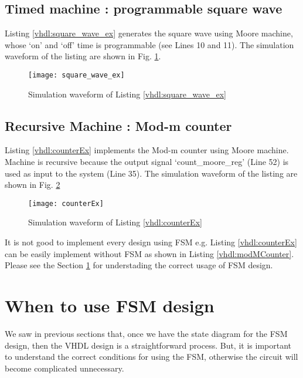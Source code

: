 

\subsection{Timed machine : programmable square wave }
Listing \ref{vhdl:square_wave_ex} generates the square wave using Moore machine, whose `on' and `off' time is programmable (see Lines 10 and 11).  The simulation waveform of the listing are shown in Fig. \ref{fig:square_wave_ex}.

\begin{figure}[!h]
	\centering
	\texttt{[image: square\_wave\_ex]}
	\caption{Simulation waveform of Listing \ref{vhdl:square_wave_ex}}
	\label{fig:square_wave_ex}
\end{figure}



\subsection{Recursive Machine : Mod-m counter}
Listing \ref{vhdl:counterEx} implements the Mod-m counter using Moore machine. Machine is recursive because the output signal `count\_moore\_reg' (Line 52) is used as input to the system (Line 35). The simulation waveform of the listing are shown in Fig. \ref{fig:counterEx}

\begin{figure}[!h]
	\centering
	\texttt{[image: counterEx]}
	\caption{Simulation waveform of Listing \ref{vhdl:counterEx}}
	\label{fig:counterEx}
\end{figure}

\begin{noNumBox}
It is not good to implement every design using FSM e.g. Listing \ref{vhdl:counterEx} can be easily implement without FSM as shown in Listing \ref{vhdl:modMCounter}. Please see the Section \ref{sec:whentouseFsm} for understading the correct usage of FSM design. 
\end{noNumBox}
	



\section{When to use FSM design}\label{sec:whentouseFsm}
We saw in previous sections that, once we have the state diagram for the FSM design, then the VHDL design is a straightforward process. But, it is important to understand the correct conditions for using the FSM, otherwise the circuit will become complicated unnecessary. 


